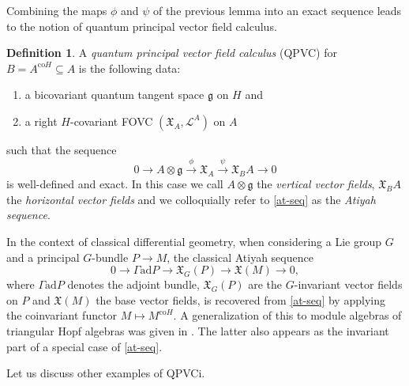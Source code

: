 \documentclass{article}
\theoremstyle{definition}
\newtheorem{definition}[thm]{Definition}
\begin{document}
Combining the maps $\phi$ and $\psi$ of the previous lemma into an exact sequence leads to the notion of quantum principal vector field calculus.
\begin{definition}\label{qpvc-def}
	A \textit{quantum principal vector field calculus} (QPVC)
	for $B=A^{\mathrm{co}H}\subseteq A$ is the following data:
	\begin{enumerate}
		\item[i.)] a 
		bicovariant quantum tangent space $\mathfrak{g}$ on $H$ and
		
		\item[ii.)] a right $H$-covariant FOVC $(\mathfrak{X}_A,\mathscr{L}^A)$ on $A$
	\end{enumerate}
	such that the sequence
	\begin{equation}\label{at-seq}
		0\to A\otimes\mathfrak{g}\xrightarrow{\phi}\mathfrak{X}_A\xrightarrow{\psi} \mathfrak{X}_BA\to 0
	\end{equation}
	is well-defined and exact.
	In this case we call $A\otimes\mathfrak{g}$ the \textit{vertical vector fields}, $\mathfrak{X}_BA$ the \textit{horizontal vector fields} and we colloquially refer to \eqref{at-seq} as the \textit{Atiyah sequence}.
\end{definition}

In the context of classical differential geometry, when considering a Lie group $G$ and a principal $G$-bundle $P\to M$, the classical Atiyah sequence
\begin{equation}
	0\to\Gamma\mathrm{ad}P\to\mathfrak{X}_G(P)\to\mathfrak{X}(M)\to 0,
\end{equation}
where $\Gamma\mathrm{ad}P$ denotes the adjoint bundle, $\mathfrak{X}_G(P)$ are the $G$-invariant vector fields on $P$ and $\mathfrak{X}(M)$ the base vector fields,
is recovered from \eqref{at-seq} by applying the coinvariant functor $M\mapsto M^{\mathrm{co}H}$. A generalization of this to module algebras of triangular Hopf algebras was given in \cite[Equation (3.1)]{AschieriLandiPagani}. The latter also appears as the invariant part of a special case of \eqref{at-seq}.

Let us discuss other examples of QPVCi.
\end{document}
